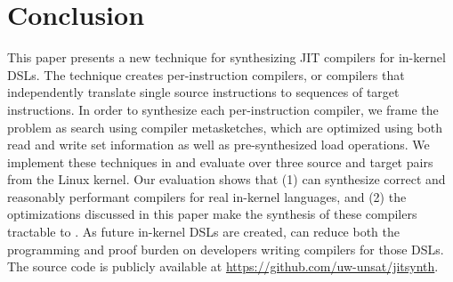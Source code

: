 \section{Conclusion}\label{jitsynth:s:conclusion}
This paper presents a new technique for synthesizing JIT compilers for in-kernel
DSLs. The technique creates per-instruction compilers, or compilers that
independently translate single source instructions to sequences of target
instructions. In order to synthesize each per-instruction compiler, we frame the
problem as search using compiler metasketches, which are optimized using both
read and write set information as well as pre-synthesized load operations. We
implement these techniques in \jitsynth and evaluate \jitsynth over three source
and target pairs from the Linux kernel. Our evaluation shows that (1) \jitsynth
can synthesize correct and reasonably performant compilers for real in-kernel languages,
and (2) the optimizations discussed in this paper make the synthesis of these
compilers tractable to \jitsynth. As future in-kernel DSLs are created,
\jitsynth can reduce both the programming and proof burden on developers writing
compilers for those DSLs. The \jitsynth source code is publicly available at
\url{https://github.com/uw-unsat/jitsynth}.
